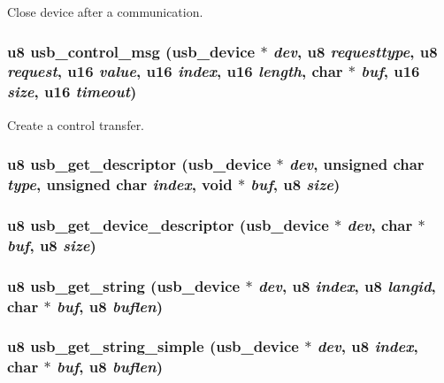 Close device after a communication. 
\subsubsection{\setlength{\rightskip}{0pt plus 5cm}u8 usb\_\-control\_\-msg ({\bf usb\_\-device} $\ast$ {\em dev}, u8 {\em requesttype}, u8 {\em request}, u16 {\em value}, u16 {\em index}, u16 {\em length}, char $\ast$ {\em buf}, u16 {\em size}, u16 {\em timeout})}\label{usb_8h_1819f0ea1b21096f25d9f7f6747aae41}


Create a control transfer. 
\subsubsection{\setlength{\rightskip}{0pt plus 5cm}u8 usb\_\-get\_\-descriptor ({\bf usb\_\-device} $\ast$ {\em dev}, unsigned char {\em type}, unsigned char {\em index}, void $\ast$ {\em buf}, u8 {\em size})}\label{usb_8h_c018ca15172cdaf5e46cb88eadee6de2}


\subsubsection{\setlength{\rightskip}{0pt plus 5cm}u8 usb\_\-get\_\-device\_\-descriptor ({\bf usb\_\-device} $\ast$ {\em dev}, char $\ast$ {\em buf}, u8 {\em size})}\label{usb_8h_30772d3ad0aab2e7185c3678c95cc604}


\subsubsection{\setlength{\rightskip}{0pt plus 5cm}u8 usb\_\-get\_\-string ({\bf usb\_\-device} $\ast$ {\em dev}, u8 {\em index}, u8 {\em langid}, char $\ast$ {\em buf}, u8 {\em buflen})}\label{usb_8h_5ebf547e758584cccc3d12def6b2706a}


\subsubsection{\setlength{\rightskip}{0pt plus 5cm}u8 usb\_\-get\_\-string\_\-simple ({\bf usb\_\-device} $\ast$ {\em dev}, u8 {\em index}, char $\ast$ {\em buf}, u8 {\em buflen})}\label{usb_8h_c724192e64a16676a38f9a84c6e0a657}


